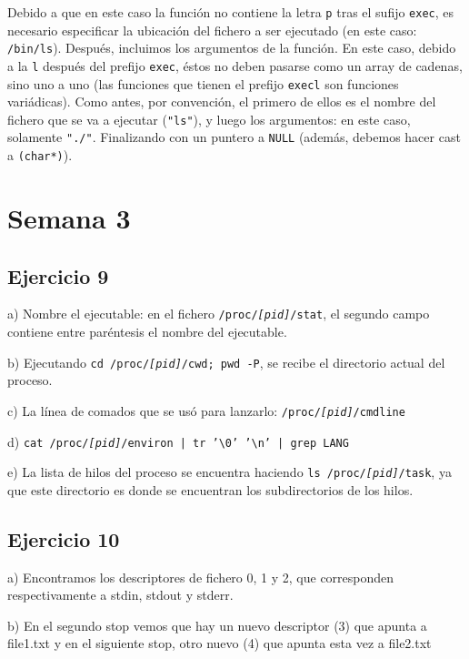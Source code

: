 \documentclass{article}
\begin{document}
Debido a que en este caso la función no contiene la letra \texttt{p} tras el sufijo \texttt{exec}, es necesario especificar la ubicación del fichero a ser ejecutado (en este caso: \texttt{/bin/ls}). Después, incluimos los argumentos de la función. En este caso, debido a la \texttt{l} después del prefijo \texttt{exec}, éstos no deben pasarse como un array de cadenas, sino uno a uno (las funciones que tienen el prefijo \texttt{execl} son funciones variádicas). Como antes, por convención, el primero de ellos es el nombre del fichero que se va a ejecutar (\texttt{"ls"}), y luego los argumentos: en este caso, solamente \texttt{"./"}. Finalizando con un puntero a \texttt{NULL} (además, debemos hacer cast a \texttt{(char*)}).

\section*{Semana 3}

\subsection*{Ejercicio 9}

a) Nombre el ejecutable: en el fichero \texttt{/proc/\textit{[pid]}/stat}, el segundo campo contiene entre paréntesis el nombre del ejecutable.

b) Ejecutando \texttt{cd /proc/\textit{[pid]}/cwd; pwd -P}, se recibe el directorio actual del proceso.

c) La línea de comados que se usó para lanzarlo: \texttt{/proc/\textit{[pid]}/cmdline}

d) \texttt{cat /proc/\textit{[pid]}/environ | tr '\textbackslash 0' '\textbackslash n' | grep LANG}

e) La lista de hilos del proceso se encuentra haciendo \texttt{ls /proc/\textit{[pid]}/task}, ya que este directorio es donde se encuentran los subdirectorios de los hilos.

\subsection*{Ejercicio 10}

a) Encontramos los descriptores de fichero 0, 1 y 2, que corresponden respectivamente a stdin, stdout y stderr.

b) En el segundo stop vemos que hay un nuevo descriptor (3) que apunta a file1.txt y en el siguiente stop, otro nuevo (4) que apunta esta vez a file2.txt
\end{document}
